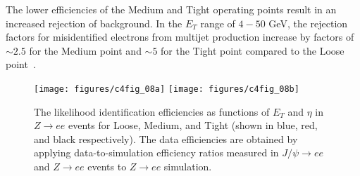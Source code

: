 The lower efficiencies of the Medium and Tight operating points result in an
increased rejection of background. In the $E_T$ range of $4-50$ GeV, the
rejection factors for misidentified electrons from multijet production increase
by factors of $\sim 2.5$ for the Medium point and $\sim 5$ for the Tight point
compared to the Loose point~\cite{atlaselcid}.

\begin{figure}[H]
	\texttt{[image: figures/c4fig\_08a]}
	\texttt{[image: figures/c4fig\_08b]}
	\centering

	\caption{The likelihood identification efficiencies as functions of $E_T$ and
		$\eta$ in $Z\to ee$ events for Loose, Medium, and Tight (shown in blue, red,
		and black respectively). The data efficiencies are obtained by applying
		data-to-simulation efficiency ratios measured in $J/\psi\to ee$ and $Z\to ee$
		events to $Z\to ee$ simulation.}

	\label{f:ch4ideffa}

\end{figure}


